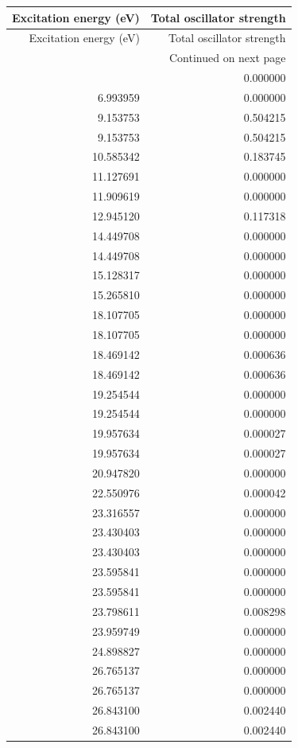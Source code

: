 \begin{longtable}{rr}
\toprule
Excitation energy (eV) & Total oscillator strength \\
\midrule
\endfirsthead
\toprule
Excitation energy (eV) & Total oscillator strength \\
\midrule
\endhead
\midrule
\multicolumn{2}{r}{Continued on next page} \\
\midrule
\endfoot
\bottomrule
\endlastfoot
6.993959 & 0.000000 \\
6.993959 & 0.000000 \\
9.153753 & 0.504215 \\
9.153753 & 0.504215 \\
10.585342 & 0.183745 \\
11.127691 & 0.000000 \\
11.909619 & 0.000000 \\
12.945120 & 0.117318 \\
14.449708 & 0.000000 \\
14.449708 & 0.000000 \\
15.128317 & 0.000000 \\
15.265810 & 0.000000 \\
18.107705 & 0.000000 \\
18.107705 & 0.000000 \\
18.469142 & 0.000636 \\
18.469142 & 0.000636 \\
19.254544 & 0.000000 \\
19.254544 & 0.000000 \\
19.957634 & 0.000027 \\
19.957634 & 0.000027 \\
20.947820 & 0.000000 \\
22.550976 & 0.000042 \\
23.316557 & 0.000000 \\
23.430403 & 0.000000 \\
23.430403 & 0.000000 \\
23.595841 & 0.000000 \\
23.595841 & 0.000000 \\
23.798611 & 0.008298 \\
23.959749 & 0.000000 \\
24.898827 & 0.000000 \\
26.765137 & 0.000000 \\
26.765137 & 0.000000 \\
26.843100 & 0.002440 \\
26.843100 & 0.002440 \\

\end{longtable}
